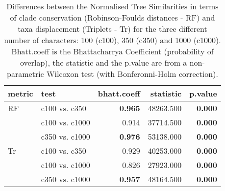 \begin{table}[ht]
\centering
\begin{tabular}{llr|rr}
  \hline
metric & test & bhatt.coeff & statistic & p.value \\ 
  \hline
RF & c100 vs. c350 & \textbf{0.965} & 48263.500 & \textbf{0.000} \\ 
   & c100 vs. c1000 & 0.914 & 37714.500 & \textbf{0.000} \\ 
   & c350 vs. c1000 & \textbf{0.976} & 53138.000 & \textbf{0.000} \\ 
  Tr & c100 vs. c350 & 0.929 & 40253.000 & \textbf{0.000} \\ 
   & c100 vs. c1000 & 0.826 & 27923.000 & \textbf{0.000} \\ 
   & c350 vs. c1000 & \textbf{0.957} & 48164.500 & \textbf{0.000} \\ 
   \hline
\end{tabular}
\caption{Differences between the Normalised Tree Similarities in terms of clade conservation (Robinson-Foulds distances - RF) and taxa displacement (Triplets - Tr) for the three different number of characters: 100 (c100), 350 (c350) and 1000 (c1000). Bhatt.coeff is the Bhattacharrya Coefficient (probability of overlap), the statistic and the p.value are from a non-parametric Wilcoxon test (with Bonferonni-Holm correction).} 
\label{Tab_pooledscharacters_test}
\end{table}
